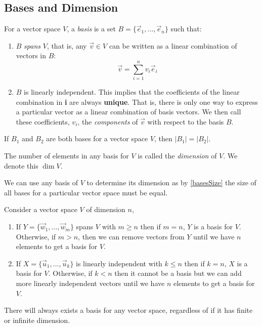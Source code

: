 \documentclass[../main.tex]{subfiles}
\begin{document}
\subsection{Bases and Dimension}
\begin{definition}[Basis]
  For a vector space $V$, a \textit{basis} is a set $B = \{\vec{e}_1, \ldots, \vec{e}_n\}$ such that:
  \begin{enumerate}
    \item $B$ \textit{spans} $V$, that is, any $\vec{v} \in V$ can be written as a linear combination of vectors in $B$:
      \[
        \vec{v} = \sum_{i=1}^{n} v_i \vec{e}_i
      \]
    \item $B$ is linearly independent.
      This implies that the coefficients of the linear combination in \textbf{i} are always \textbf{unique}.
      That is, there is only one way to express a particular vector as a linear combination of basis vectors.
      We then call these coefficients, $v_i$, the \textit{components} of $\vec{v}$ with respect to the basis $B$.
  \end{enumerate}
\end{definition}
\begin{theorem}
  If $B_1$ and $B_2$ are both bases for a vector space $V$, then $|B_1| = |B_2|$.
  \label{basesSize}
\end{theorem}
\begin{definition}[Dimension]
  The number of elements in any basis for $V$ is called the \textit{dimension} of $V$.
  We denote this $\dim V$.
\end{definition}
\begin{remark}[Note]
  We can use any basis of $V$ to determine its dimension as by \cref{basesSize} the size of all bases for a particular vector space must be equal.
\end{remark}
\begin{proposition}
  Consider a vector space $V$ of dimension $n$,
  \begin{enumerate}
    \item If $Y = \{\vec{w}_1, \ldots, \vec{w}_m\}$ spans $V$ with $m \geq n$ then if $m = n$, $Y$ is a basis for $V$.
      Otherwise, if $m > n$, then we can remove vectors from $Y$ until we have $n$ elements to get a basis for $V$.
    \item If $X = \{\vec{u}_1, \ldots, \vec{u}_k\}$ is linearly independent with $k \leq n$ then if $k = n$, $X$ is a basis for $V$.
      Otherwise, if $k < n$ then it cannot be a basis but we can add more linearly independent vectors until we have $n$ elements to get a basis for $V$.
  \end{enumerate}
\end{proposition}
\begin{remark}
  There will always exists a basis for any vector space, regardless of if it has finite or infinite dimension.
\end{remark}
\end{document}
